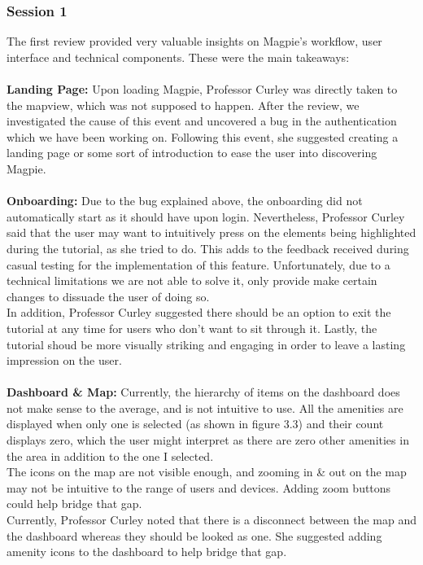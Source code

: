 \subsubsection{Session 1}
The first review provided very valuable insights on Magpie's workflow, user interface and technical components. These were the main takeaways:\\ \\
\textbf{Landing Page: }
Upon loading Magpie, Professor Curley was directly taken to the mapview, which was not supposed to happen. After the review, we investigated the cause of this event and uncovered a bug in the authentication which we have been working on. Following this event, she suggested creating a landing page or some sort of introduction to ease the user into discovering Magpie.\\ \\
\textbf{Onboarding: }
Due to the bug explained above, the onboarding did not automatically start as it should have upon login. Nevertheless, Professor Curley said that the user may want to intuitively press on the elements being highlighted during the tutorial, as she tried to do. This adds to the feedback received during casual testing for the implementation of this feature. Unfortunately, due to a technical limitations we are not able to solve it, only provide make certain changes to dissuade the user of doing so.\\
In addition, Professor Curley suggested there should be an option to exit the tutorial at any time for users who don't want to sit through it. Lastly, the tutorial shoud be more visually striking and engaging in order to leave a lasting impression on the user.\\ \\
\textbf{Dashboard \& Map: }
Currently, the hierarchy of items on the dashboard does not make sense to the average, and is not intuitive to use. All the amenities are displayed when only one is selected (as shown in figure 3.3) and their count displays zero, which the user might interpret as there are zero other amenities in the area in addition to the one I selected.\\
The icons on the map are not visible enough, and zooming in \& out on the map may not be intuitive to the range of users and devices. Adding zoom buttons could help bridge that gap. \\
Currently, Professor Curley noted that there is a disconnect between the map and the dashboard whereas they should be looked as one. She suggested adding amenity icons to the dashboard to help bridge that gap.\\ \\

